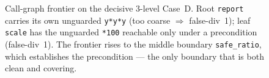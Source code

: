 \begin{figure}[t]
  \centering
  \caption{Call-graph frontier on the decisive 3-level Case~D. Root
    \texttt{report} carries its own unguarded \texttt{y*y*y} (too coarse $\Rightarrow$
    false-div~1); leaf \texttt{scale} has the unguarded \texttt{*100} reachable only
    under a precondition (false-div~1). The frontier rises to the middle boundary
    \texttt{safe\_ratio}, which establishes the precondition --- the only boundary
    that is both clean and covering.}
  \label{fig:frontier-cased}
\end{figure}


